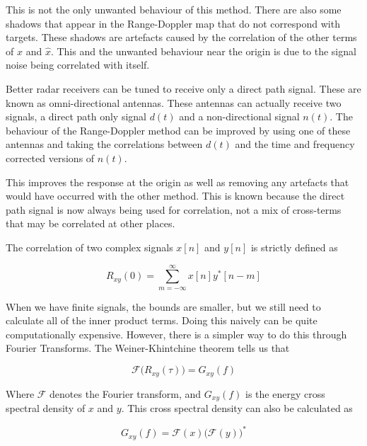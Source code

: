 \documentclass[12pt,openany,a4paper]{book}
\begin{document}
\bigskip

This is not the only unwanted behaviour of this method. There are also some shadows that appear in the Range-Doppler map that do not correspond with targets. These shadows are artefacts caused by the correlation of the other terms of $x$ and $\hat{x}$. This and the unwanted behaviour near the origin is due to the signal noise being correlated with itself.

\bigskip

Better radar receivers can be tuned to receive only a direct path signal. These are known as omni-directional antennas. These antennas can actually receive two signals, a direct path only signal $d(t)$ and a non-directional signal $n(t)$. The behaviour of the Range-Doppler method can be improved by using one of these antennas and taking the correlations between $d(t)$ and the time and frequency corrected versions of $n(t)$.

\bigskip

This improves the response at the origin as well as removing any artefacts that would have occurred with the other method. This is known because the direct path signal is now always being used for correlation, not a mix of cross-terms that may be correlated at other places.

\bigskip

The correlation of two complex signals $x[n]$ and $y[n]$ is strictly defined as

\begin{equation}
R_{xy}(0) = \sum_{m=-\infty}^{\infty} x[n] y^*[n-m]
\end{equation}

\bigskip

When we have finite signals, the bounds are smaller, but we still need to calculate all of the inner product terms. Doing this naively can be quite computationally expensive. However, there is a simpler way to do this through Fourier Transforms. The Weiner-Khintchine theorem tells us that 

\begin{equation}
\mathcal{F} \bigg(R_{xy}(\tau) \bigg) = G_{xy}(f)
\end{equation}

\bigskip

Where $\mathcal{F}$ denotes the Fourier transform, and $G_{xy}(f)$ is the energy cross spectral density of $x$ and $y$. This cross spectral density can also be calculated as 

\begin{equation}
G_{xy}(f) = \mathcal{F}(x) \bigg(\mathcal{F}(y)\bigg)^*
\end{equation}
\end{document}
